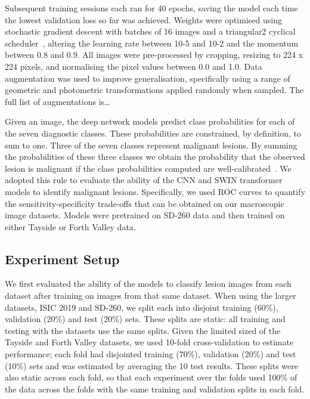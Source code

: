 Subsequent training sessions each ran for 40 epochs, saving the model each time the lowest validation loss so far was achieved. Weights were optimised using stochastic gradient descent with batches of 16 images and a triangular2 cyclical scheduler~\citep{smith2017cyclical}, altering the learning rate between 10-5 and 10-2 and the momentum between 0.8 and 0.9. All images were pre-processed by cropping, resizing to 224 x 224 pixels, and normalising the pixel values between 0.0 and 1.0. Data augmentation was used to improve generalisation, specifically using a range of geometric and photometric transformations applied randomly when sampled. The full list of augmentations is…

Given an image, the deep network models predict class probabilities for each of the seven diagnostic classes. These probabilities are constrained, by definition, to sum to one. Three of the seven classes represent malignant lesions. By summing the probabilities of these three classes we obtain the probability that the observed lesion is malignant if the class probabilities computed are well-calibrated~\citep{carse2022calibration}. We adopted this rule to evaluate the ability of the CNN and SWIN transformer models to identify malignant lesions. Specifically, we used ROC curves to quantify the sensitivity-specificity trade-offs that can be obtained on our macroscopic image datasets. Models were pretrained on SD-260 data and then trained on either Tayside or Forth Valley data.

\subsection{Experiment Setup}
\label{subsec:generalisation_experiment}
We first evaluated the ability of the models to classify lesion images from each dataset after training on images from that same dataset. When using the larger datasets, ISIC 2019 and SD-260, we split each into disjoint training (60\%), validation (20\%) and test (20\%) sets. These splits are static: all training and testing with the datasets use the same splits. Given the limited sized of the Tayside and Forth Valley datasets, we used 10-fold cross-validation to estimate performance; each fold had disjointed training (70\%), validation (20\%) and test (10\%) sets and was estimated by averaging the 10 test results. These splits were also static across each fold, so that each experiment over the folds used 100\% of the data across the folds with the same training and validation splits in each fold.

